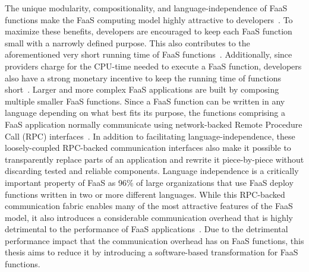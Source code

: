 \documentclass[../main.tex]{subfiles}
\begin{document}
\begin{refsection}
The unique modularity, compositionality, and language-independence of
FaaS functions make the FaaS computing model highly attractive to
developers~\cite{williams16_growin_need_micros_bioin}. To maximize
these benefits, developers are encouraged to keep each FaaS
function small with a narrowly defined purpose. This also contributes
to the aforementioned very short running time of FaaS
functions~\cite{shahrad19_archit_implic_funct_servic_comput,mahgoub22_wisef,shahrad20_server_wild,lukewarm_serverless,du20_catal}. Additionally,
since providers charge for the CPU-time needed to execute a FaaS
function, developers also have a strong monetary incentive to keep the
running time of functions short~\cite{yu20_charac_server_platf_server}.  Larger and more
complex FaaS applications are built by composing multiple smaller FaaS
functions. Since a FaaS function can be written in any language
depending on what best fits its purpose, the functions comprising a
FaaS application normally communicate using network-backed Remote
Procedure Call (RPC)
interfaces~\cite{gan19_open_sourc_bench_suite_micros}. In addition to
facilitating language-independence, these loosely-coupled RPC-backed
communication interfaces also make it possible to transparently
replace parts of an application and rewrite it piece-by-piece
without discarding tested and reliable components. Language
independence is a critically important property of FaaS as 96\% of
large organizations that use FaaS deploy functions written in two or
more different languages\cite{serverless_state}. While this RPC-backed
communication fabric enables many of the most attractive features of
the FaaS model, it also introduces a considerable communication
overhead that is highly detrimental to the performance of FaaS
applications~\cite{stellar}. Due
to the detrimental performance impact that the communication overhead
has on FaaS functions, this thesis aims to reduce it by introducing a
software-based transformation for FaaS functions.





\end{refsection}
\end{document}
